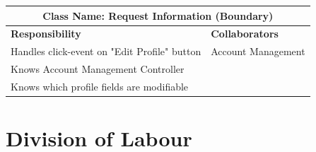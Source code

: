 \documentclass[]{article}
\begin{document}
\begin{itemize}
        \begin{table}[H]
        \centering
        \renewcommand{\arraystretch}{1.3} %
        \begin{tabular}{|p{6cm}|p{6cm}|} 
        \hline
        \multicolumn{2}{|c|}{\textbf{Class Name: Request Information (Boundary)}} \\ 
        \hline
        \textbf{Responsibility} & \textbf{Collaborators} \\ 
        \hline
        Handles click-event on "Edit Profile" button & Account Management \\
        Knows Account Management Controller & \\
        Knows which profile fields are modifiable & \\
        \hline
        \end{tabular}
        \label{tab:crc_card}
        \end{table}
\end{itemize}

\appendix
\section{Division of Labour}
\label{sec:division_of_labour}
\end{document}
